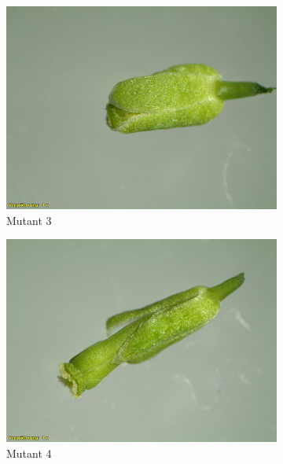 \documentclass[10pt,a4paper]{article}
\begin{document}
\begin{figure}[H]
\begin{subfigure}[b]{0.45\textwidth}
				\includegraphics[width=\textwidth]{3_O+A(MU).jpg}
				\caption{Mutant 3}
				\label{fig:M3}
			\end{subfigure}
			\hfill
			\begin{subfigure}[b]{0.45\textwidth}
				\includegraphics[width=\textwidth]{4_O+A(MU).jpg}
				\caption{Mutant 4}
				\label{fig:M4}
			\end{subfigure}
			\hfill
			\begin{subfigure}[b]{0.45\textwidth}
				\centering

\end{subfigure}
\end{figure}
\end{document}
